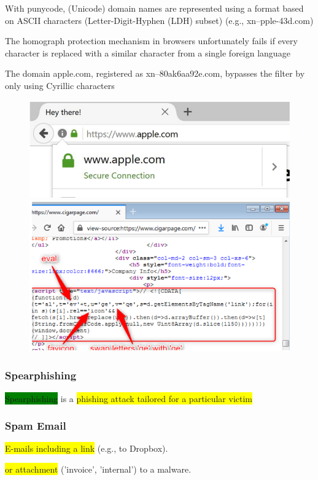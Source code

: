 \documentclass[]{project_plan}
\begin{document}
With punycode, (Unicode) domain names are represented using a format based on ASCII
characters (Letter-Digit-Hyphen (LDH) subset) (e.g., xn–pple-43d.com)

The homograph protection mechanism in browsers unfortunately fails if every character is
replaced with a similar character from a single foreign language

The domain apple.com, registered as xn–80ak6aa92e.com, bypasses the filter by only using
Cyrillic characters

\begin{figure}[H]
  \centering
  \includegraphics[width=.8\linewidth]{phishing_homograph1.png}
  \includegraphics[width=.8\linewidth]{phishing_homograph2.png}
\end{figure}

\subsubsection{Spearphishing}
\colorbox{green}{Spearphishing} is a \colorbox{yellow}{phishing attack tailored for a particular victim}

\subsubsection{Spam Email}
\colorbox{yellow}{E-mails including a link} (e.g., to Dropbox).

\colorbox{yellow}{or attachment} (’invoice’, ’internal’) to a malware.
\end{document}
